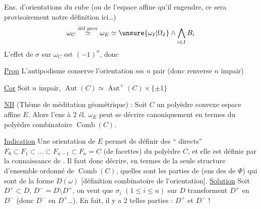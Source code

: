 Ens. d'orientations du cube (ou de l'espace affine qu'il engendre, ce sera provisoirement notre définition ici\ldots)
\[
\omega_C\overset{\text{déf prov}}{\simeq}\omega_E\simeq
\unsure{\omega_I|\Omega_I}\wedge\bigwedge_{i\in I}B_i
\]
L'effet de $\sigma$ sur $\omega_C$ est $(-1)^n$, donc

\uline{Prop} L'antipodisme conserve l'orientation sss $n$ pair (donc  renverse  $n$ impair)

\uline{Cor} Soit $n$ impair, $\operatorname{Aut}(C)\simeq\operatorname{Aut}^+(C)\times\{\pm1\}$

\uline{NB} (Thème de méditation géométrique) : Soit $C$ un polyèdre convexe  espace affine $E$. Alors l'ens à 2 él. $\omega_E$ peut se décrire canoniquement en termes du polyèdre combinatoire $\operatorname{Comb}(C)$.

\uline{Indication} Une orientation \inserted{$\omega$} de $E$ permet de définir  des ``  directs'' $F_0\subset F_1\subset\ldots\subset F_{n-1}\subset F_n=C$ (de facettes) du polyèdre $C$, et elle est définie par la connaissance de  . Il faut donc décrire, en termes de la seule structure d'ensemble ordonné de \inserted{$\Phi=$}$\operatorname{Comb}(C)$, quelles sont les parties de   (ens des   de $\Phi$) qui sont de la forme $D(\omega)$ [définition combinatoire de l'orientation]. \uline{Solution} Soit $D^+\subset D$, $D^-=D\setminus D^+$, on veut que  $\sigma_i$ $(1\leq i\leq n)$ sur $D$ transforment $D^+$ en $D^-$ (donc $D^-$ en $D^+$\ldots). En fait, il y a  2 telles parties : $D^+$ et $D^-$ !
